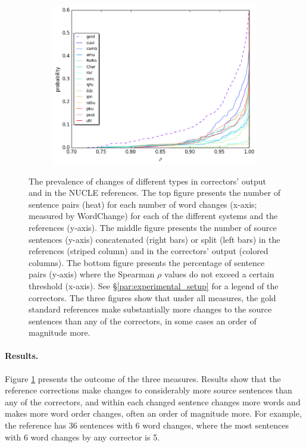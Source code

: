 \documentclass[letterpaper, 11pt]{article}
\begin{document}
\begin{figure}
\begin{subfigure}[]{0.4\textwidth}
    \includegraphics[width = \textwidth]{spearman_ecdf}
  \end{subfigure}
  \caption{\label{fig:over-conservatism}
    The prevalence of changes of different types in correctors' output and in the NUCLE references.
    The top figure presents the number of sentence pairs (heat) for each number of word changes
    (x-axis; measured by {\sc WordChange}) for each of the different systems and the references (y-axis).
    The middle figure presents the number of source sentences (y-axis) concatenated (right bars) or split (left bars) in the references (striped column) and in the correctors' output (colored columns).
    The bottom figure presents the percentage of sentence pairs (y-axis) where the
    Spearman $\rho$ values do not exceed a certain threshold (x-axis).
    See \S \ref{par:experimental_setup} for a legend of the correctors.
    The three figures show that under all measures, the gold standard references make
    substantially more changes to the source sentences than any of the correctors,
    in some cases an order of magnitude more.
  }
\end{figure}
\vspace{-.2cm}
\paragraph{Results.}
Figure \ref{fig:over-conservatism} presents the outcome of the three measures. 
Results show that the reference corrections make changes to considerably more source sentences than any of the correctors, and within each changed sentence changes more words and makes more word order changes, often an order of magnitude more. For example, the reference has 36 sentences with 6 word changes, where the most sentences with 6 word changes by any corrector is 5.
\end{document}
